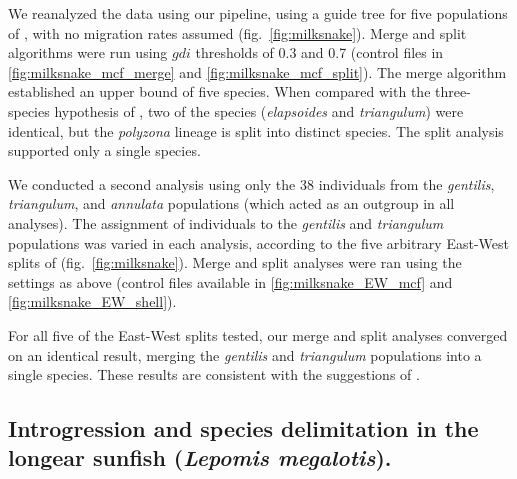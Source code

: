 \documentclass{article1}
\newcommand{\red}[1]{{\color{red}{#1}}}
\newcommand{\blue}[1]{{\color{blue}{#1}}}
\begin{document}
We reanalyzed the data using our pipeline, using a guide tree for five populations of
\citet{Chambers2020}, with no migration rates assumed (fig.~\ref{fig:milksnake}).  Merge
and split algorithms were run using $gdi$ thresholds of 0.3 and 0.7 (control files
in \ref{fig:milksnake_mcf_merge} and \ref{fig:milksnake_mcf_split}).  The merge algorithm
established an upper bound of five species.  When compared with the three-species
hypothesis of \citet{Chambers2020}, two of the species (\textit{elapsoides} and
\textit{triangulum}) were identical, but the \textit{polyzona} lineage is split into
distinct species.  The split analysis supported only a single species.


We conducted a second analysis using only the 38 individuals from the \textit{gentilis},
\textit{triangulum}, and \textit{annulata} populations (which acted as an outgroup in all
analyses).  The assignment of individuals to the \textit{gentilis} and \textit{triangulum}
populations was varied in each analysis, according to the five arbitrary East-West splits
of \cite{Chambers2020} (fig.~\ref{fig:milksnake}).  Merge and split analyses were ran
using the settings as above (control files available in \ref{fig:milksnake_EW_mcf} and
\ref{fig:milksnake_EW_shell}).

For all five of the East-West splits tested, our merge and split analyses converged on an
identical result, merging the \textit{gentilis} and \textit{triangulum} populations into a
single species.  These results are consistent with the suggestions of \cite{Chambers2020}.

\red{[Comment on the $\sim$0 estimates of migration rates between geographic populations.]}\blue{[As patterns of hybridization or migration for nuclear genes were not specified in the Chambers and Hillis paper, and only nuclear genes were used in the analysis, the model was run without migration (just MSC), thus no migration rates were estimated (See control files in S5 an S6)]}

\newpage

\subsection{Introgression and species delimitation in the longear sunfish (\emph{Lepomis
megalotis}).}
\end{document}
